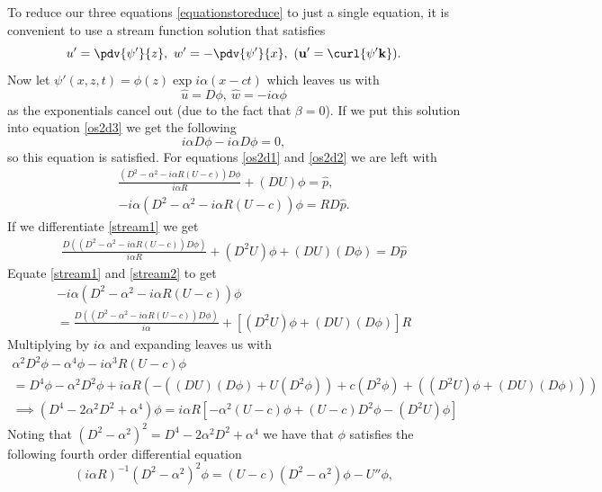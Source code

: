 To reduce our three equations \eqref{equationstoreduce} to just a single equation, it is convenient to use a stream function solution that satisfies
\begin{equation}
    u' = \pdv{\psi'}{z}, \ w' = - \pdv{\psi'}{x},  \ (\mathbf{u}' = \curl{\psi' \mathbf{k}}).
    \label{streamfunction}
\end{equation}
Now let $ \psi'(x, z, t) = \phi(z) \exp{i \alpha(x - ct)} $ which leaves us with
\begin{equation}
    \hat{u} = D \phi, \  \hat{w} = -i \alpha \phi
\end{equation}
as the exponentials cancel out (due to the fact that $ \beta = 0$).
If we put this solution into equation \eqref{os2d3} we get the following
\begin{equation}
    i \alpha D \phi - i \alpha D \phi = 0,
\end{equation}
so this equation is satisfied. For equations \eqref{os2d1} and \eqref{os2d2} we are left with
\begin{gather}
    \frac{(D^2 - \alpha^2 - i \alpha R ( U - c)) D \phi}{i \alpha R} + (DU) \phi = \hat{p}, \label{stream1}\\
    -i \alpha (D^2 - \alpha^2 - i \alpha R (U - c)) \phi = R D \hat{p}. \label{stream2}
\end{gather}
If we differentiate \eqref{stream1} we get
\begin{gather}
     \frac{D((D^2 - \alpha^2 - i \alpha R ( U - c)) D \phi)}{i \alpha R} + (D^2 U) \phi + (DU)(D \phi) = D \hat{p}
\end{gather}
Equate \eqref{stream1} and \eqref{stream2} to get
\begin{gather}
        -i \alpha (D^2 - \alpha^2 - i \alpha R (U - c)) \phi \nonumber\\ = \frac{D((D^2 - \alpha^2 - i \alpha R ( U - c)) D \phi)}{i \alpha} + [(D^2 U) \phi + (DU)(D \phi)] R
\end{gather}
Multiplying by $ i \alpha $ and expanding leaves us with 
\begin{gather}
    \alpha^2 D^2 \phi - \alpha^4 \phi - i \alpha^3 R (U - c) \phi\nonumber\\  = D^4 \phi - \alpha^2 D^2 \phi + i \alpha R (-( (DU) (D\phi) + U (D^2 \phi)) + c (D^2 \phi) + ((D^2 U) \phi + (DU)(D\phi))) 
    \nonumber\\ 
    \implies (D^4 - 2 \alpha^2 D^2 + \alpha^4) \phi = i \alpha R [- \alpha^2 (U - c) \phi + (U - c)D^2\phi - (D^2U)\phi]
\end{gather}
Noting that $ (D^2 - \alpha^2)^2 = D^4 - 2 \alpha^2 D^2 + \alpha^4 $ we have that $ \phi $ satisfies the following fourth order differential equation 
\begin{equation}
    (i \alpha R)^{-1} (D^2 - \alpha^2)^2 \phi = (U - c)(D^2 - \alpha^2)\phi - U'' \phi,
\label{oseq}
\end{equation}

